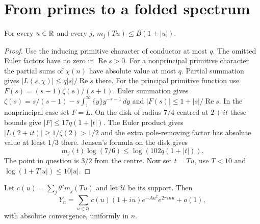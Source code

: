 \documentclass[11pt]{article}
\newcommand{\re}{\operatorname{Re}}\newcommand{\im}{\operatorname{Im}}
\begin{document}
\section{From primes to a folded spectrum}
\begin{lemma}\label{lem:count}
For every $u\in\mathbb R$ and every $j$, $m_j(Tu)\le B(1+|u|)$.
\end{lemma}
\begin{proof}
Use the inducing primitive character of conductor at most $q$. The omitted Euler factors have no zero in $\re s>0$. For a nonprincipal primitive character the partial sums of $\chi(n)$ have absolute value at most $q$. Partial summation gives $|L(s,\chi)|\le q|s|/\re s$ there. For the principal primitive function use $F(s)=(s-1)\zeta(s)/(s+1)$. Euler summation gives $\zeta(s)=s/(s-1)-s\int_1^\infty\{y\}y^{-s-1}\,dy$ and $|F(s)|\le1+|s|/\re s$. In the nonprincipal case set $F=L$. On the disk of radius $7/4$ centred at $2+it$ these bounds give $|F|\le17q(1+|t|)$. The Euler product gives $|L(2+it)|\ge1/\zeta(2)>1/2$ and the extra pole-removing factor has absolute value at least $1/3$ there. Jensen's formula on the disk gives
\[
 m_j(t)\log(7/6)\le\log(102q(1+|t|)).
\]
The point in question is $3/2$ from the centre. Now set $t=Tu$, use $T<10$ and $\log(1+T|u|)\le10|u|$.
\end{proof}
\begin{lemma}\label{lem:series}
Let $c(u)=\sum_j\theta^jm_j(Tu)$ and let $\mathcal U$ be its support. Then
\begin{equation}
 Y_n=\sum_{u\in\mathcal U} c(u)(1+iu)e^{-Au^2}e^{2\pi i n u}+o(1),
 \label{eq:series}
\end{equation}
with absolute convergence, uniformly in $n$.
\end{lemma}
\end{document}
